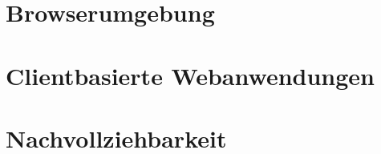 \section{Browserumgebung}
\label{sec:browserumgebung}


\section{Clientbasierte Webanwendungen}
\label{sec:clientbased-webapps}

	

%


\section{Nachvollziehbarkeit}
\label{sec:nachvollziehbarkeit}
